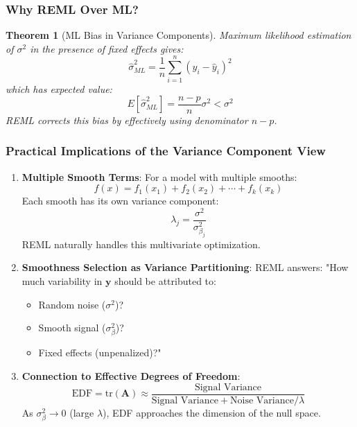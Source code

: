 \documentclass[12pt]{article}
\newtheorem{theorem}{Theorem}
\begin{document}
\subsubsection{Why REML Over ML?}

\begin{theorem}[ML Bias in Variance Components]
Maximum likelihood estimation of $\sigma^2$ in the presence of fixed effects gives:
\begin{equation}
\hat{\sigma}^2_{ML} = \frac{1}{n}\sum_{i=1}^n (y_i - \hat{y}_i)^2
\end{equation}
which has expected value:
\begin{equation}
E[\hat{\sigma}^2_{ML}] = \frac{n-p}{n}\sigma^2 < \sigma^2
\end{equation}
REML corrects this bias by effectively using denominator $n-p$.
\end{theorem}

\subsubsection{Practical Implications of the Variance Component View}

\begin{enumerate}
\item \textbf{Multiple Smooth Terms}: For a model with multiple smooths:
\begin{equation}
f(x) = f_1(x_1) + f_2(x_2) + \cdots + f_k(x_k)
\end{equation}
Each smooth has its own variance component:
\begin{equation}
\lambda_j = \frac{\sigma^2}{\sigma^2_{\beta_j}}
\end{equation}
REML naturally handles this multivariate optimization.

\item \textbf{Smoothness Selection as Variance Partitioning}: REML answers: "How much variability in $\mathbf{y}$ should be attributed to:
\begin{itemize}
    \item Random noise ($\sigma^2$)?
    \item Smooth signal ($\sigma^2_{\beta}$)?
    \item Fixed effects (unpenalized)?"
\end{itemize}

\item \textbf{Connection to Effective Degrees of Freedom}:
\begin{equation}
\text{EDF} = \text{tr}(\mathbf{A}) \approx \frac{\text{Signal Variance}}{\text{Signal Variance} + \text{Noise Variance}/\lambda}
\end{equation}
As $\sigma^2_{\beta} \to 0$ (large $\lambda$), EDF approaches the dimension of the null space.
\end{enumerate}
\end{document}
